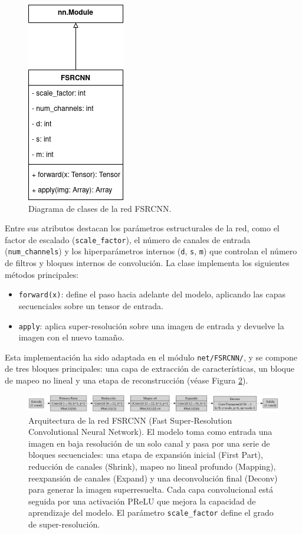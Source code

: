 \documentclass[../main.tex]{subfiles}
\begin{document}
\begin{figure}
    \centering
    \includegraphics[width=0.25\linewidth]{imgs/impl/fsrcnn-diag-class.drawio.png}
    \caption{Diagrama de clases de la red FSRCNN.}
    \label{fig:fsrcnn-class-diagram}
\end{figure}

Entre sus atributos destacan los parámetros estructurales de la red, como el factor de escalado (\texttt{scale\_factor}), el número de canales de entrada (\texttt{num\_channels}) y los hiperparámetros internos (\texttt{d}, \texttt{s}, \texttt{m}) que controlan el número de filtros y bloques internos de convolución. La clase implementa los siguientes métodos principales:

\begin{itemize}
    \item \texttt{forward(x)}: define el paso hacia adelante del modelo, aplicando las capas secuenciales sobre un tensor de entrada.

    \item \texttt{apply}: aplica super-resolución sobre una imagen de entrada y devuelve la imagen con el nuevo tamaño.
\end{itemize}
    

Esta implementación ha sido adaptada en el módulo \texttt{net/FSRCNN/}, y se compone de tres bloques principales: una capa de extracción de características, un bloque de mapeo no lineal y una etapa de reconstrucción (véase Figura \ref{fig:fsrcnn-impl-arquitectura}).

\begin{figure}[H]
    \centering
    \includegraphics[width=1\linewidth]{imgs/impl/fsrcnn.png}
    \caption{Arquitectura de la red FSRCNN (Fast Super-Resolution Convolutional Neural Network). El modelo toma como entrada una imagen en baja resolución de un solo canal y pasa por una serie de bloques secuenciales: una etapa de expansión inicial (First Part), reducción de canales (Shrink), mapeo no lineal profundo (Mapping), reexpansión de canales (Expand) y una deconvolución final (Deconv) para generar la imagen superresuelta. Cada capa convolucional está seguida por una activación PReLU que mejora la capacidad de aprendizaje del modelo. El parámetro \texttt{scale\_factor} define el grado de super-resolución.}
    \label{fig:fsrcnn-impl-arquitectura}
\end{figure}
\end{document}
